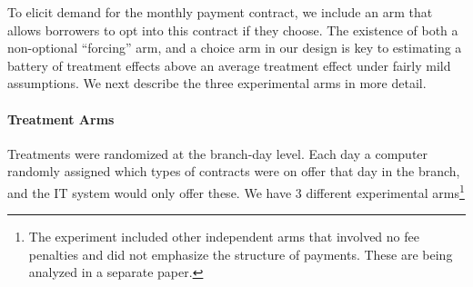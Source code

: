 \documentclass[12pt, a4paper]{article}
\begin{document}
To elicit demand for the monthly payment contract, we include an arm that allows borrowers to opt into this contract if they choose. The existence of both a non-optional ``forcing'' arm, and a choice arm in our design is key to estimating a battery of treatment effects above an average treatment effect under fairly mild assumptions. We next describe the three experimental arms in more detail. 


\paragraph*{Treatment Arms} 
Treatments were randomized at the branch-day level. Each day a computer randomly assigned which types of contracts were on offer that day in the branch, and the IT system would only offer these.  We have 3 different experimental arms\footnote{The experiment included other independent arms that involved no fee penalties and did not emphasize the structure of payments. These are being analyzed in a separate paper.} 
\end{document}
